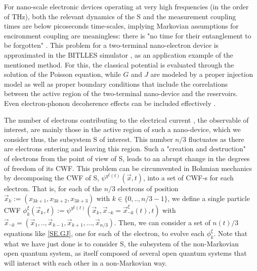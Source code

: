 \documentclass[11pt, a4paper]{article} %
\begin{document}
For nano-scale electronic devices operating at very high frequencies (in the order of THz), both the relevant dynamics of the S and the measurement coupling times are below picoseconds time-scales, implying Markovian assumptions for encironment coupling are meaningless: there is "no time for their entanglement to be forgotten" \cite{Thz}. This problem for a two-terminal nano-electron device is approximated in the BITLLES simulator \cite{tdp,Pois,Thz}, as an application example of the mentioned method. For this, the classical potential is evaluated through the solution of the Poisson equation\cite{Pois}, while $G$ and $J$ are modeled by a proper injection model \cite{inject} as well as proper boundary conditions \cite{boundary1, boundary2} that include the correlations between the active region of the two-terminal nano-device and the reservoirs. Even electron-phonon decoherence effects can be included effectively \cite{eph}.

The number of electrons contributing to the electrical current , the observable of interest, are mainly those in the active region of such a nano-device, which we consider thus, the subsystem S of interest. This number $n/3$ fluctuates as there are electrons entering and leaving this region. Such a "creation and destruction" of electrons from the point of view of S, leads to an abrupt change in the degrees of freedom of its CWF. This problem can be circumvented in Bohmian mechanics by decomposing the CWF of S, $\psi^{y^\xi(t)}(\vec{x},t)$, into a set of CWF-s for each electron. That is, for each of the $n/3$ electrons of position $\vec{x}_k:=(x_{3k+1}, x_{3k+2}, x_{3k+3})$ with $k\in\{0,..,n/3-1\}$, we define a single particle CWF $\phi_k^\xi(\vec{x}_k, t):=\psi^{y^\xi(t)}(\vec{x}_k, \vec{x}_{\neg k}=\vec{x}_{\neg k}^\xi(t),t)$ with $\vec{x}_{\neg k}=(\vec{x}_1,..,\vec{x}_{k-1}, \vec{x}_{k+1}, ...,\vec{x}_{n/3})$. Then, we can consider a set of $n(t)/3$ equations like \eqref{SE.GJ}, one for each of the electron, to evolve each $\phi_k^\xi$. Note that what we have just done is to consider S, the subsystem of the non-Markovian open quantum system, as itself composed of several open quantum systems that will interact with each other in a non-Markovian way.
\end{document}
